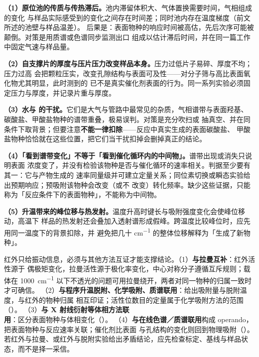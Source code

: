 \begin{pitfall}
\textbf{（1）原位池的传质与传热滞后。}池内滞留体积大、气体置换需要时间，气相组成的变化
与样品实际感受到的变化之间存在时间差；同时池内存在温度梯度（前文所述的池壁与样品温差）。
后果是：表面物种的响应时间被高估，先后次序可能被颠倒。对策是用质谱或色谱同步监测出口
组成以估计滞后时间，并在同一篇工作中固定气速与样品量。

\textbf{（2）自支撑片的厚度与压片压力改变样品本身。}压力过低片子易碎、厚度不均；压力过高
会把颗粒压实，改变孔隙结构与表面可及性——对分子筛与高比表面氧化物尤其明显，此时测到的
已不是真实催化剂表面的行为。同一系列实验必须固定压力与厚度，并记录片重与厚度。

\textbf{（3）水与  的干扰。}它们是大气与管路中最常见的杂质，气相谱带与表面羟基、
碳酸盐、甲酸盐物种的谱带重叠，极易误判。对策是充分吹扫或
抽真空、并在同条件下取背景；但要注意\textbf{不能一律扣除}——反应中真实生成的表面碳酸盐、
甲酸盐物种恰恰就在这些位置，把它们当干扰扣掉会删掉真正的结论。

\textbf{（4）「看到谱带变化」不等于「看到催化循环内的中间物」。}谱带出现或消失只说明表面
浓度变了，并没有检验该物种是否与催化循环的速率相关。判据至少要有其一：它与产物生成的
速率同量级并可建立定量关系；同位素切换或瞬态实验给出预期响应；预吸附该物种会改变（或不
改变）转化频率。缺少这些证据，只能称为「反应条件下的表面物种」，不能称为中间物。

\textbf{（5）升温带来的峰位移与热发射。}温度升高时键长与吸附强度变化会使峰位移动，高温下
样品的热发射还会叠加入透射谱形成假峰。跨温度比较峰位时，应先用同一温度下的背景扣除，并
避免把几十 \unit{cm^{-1}} 的整体位移解释为「生成了新物种」。
\end{pitfall}

\begin{crosscheck}
红外只给振动信息，必须与其他方法互证才能支撑结论。（1）\textbf{与拉曼互补}：红外活性源于
偶极矩变化，拉曼活性源于极化率变化，中心对称分子遵循互斥规则；载体在
\qty{1000}{cm^{-1}} 以下不透光的问题可用拉曼绕开，两者对同一物种的归属一致时才可确信。
（2）\textbf{与程序升温脱附、化学吸附、质谱联用}：给出吸附量与脱附温度，与红外的物种归属
相互印证；活性位数目的定量属于化学吸附方法的范围（）。
（3）\textbf{与 X 射线衍射等体相方法联用}：区分表面物种与体相变化（）。
（4）\textbf{与在线色谱／质谱联用}构成 operando，把表面物种与反应速率关联；催化剂比表面
与孔结构的变化则回到物理吸附（）。
若红外与拉曼、或红外与脱附实验给出矛盾结论，应先检查标定、基线与样品状态，而不是择一采信。
\end{crosscheck}

